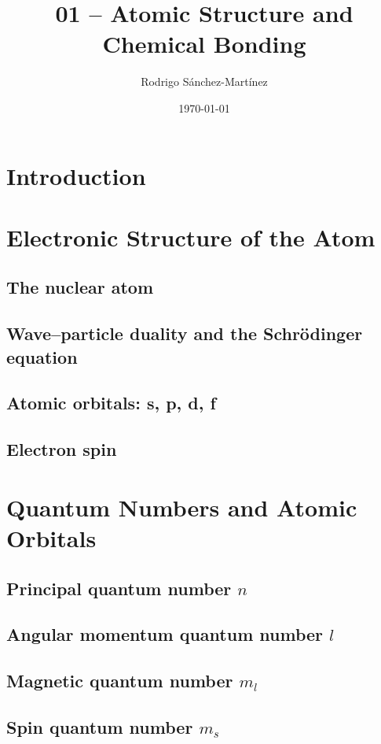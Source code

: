 \documentclass[11pt]{article}
\title{\textbf{01 -- Atomic Structure and Chemical Bonding}}
\author{Rodrigo Sánchez-Martínez}
\date{\today}
\begin{document}
	
\maketitle	
	
\tableofcontents

\section{Introduction}

\section{Electronic Structure of the Atom}
	\subsection{The nuclear atom}
	\subsection{Wave--particle duality and the Schrödinger equation}
	\subsection{Atomic orbitals: s, p, d, f}
	\subsection{Electron spin}

\section{Quantum Numbers and Atomic Orbitals}
	\subsection{\texorpdfstring{Principal quantum number $n$}{Principal quantum number n}}
	\subsection{\texorpdfstring{Angular momentum quantum number $l$}{Angular momentum quantum number l}}
	\subsection{\texorpdfstring{Magnetic quantum number $m_l$}{Magnetic quantum number m sub l}}
	\subsection{\texorpdfstring{Spin quantum number $m_s$}{Spin quantum number m sub s}}
\end{document}
